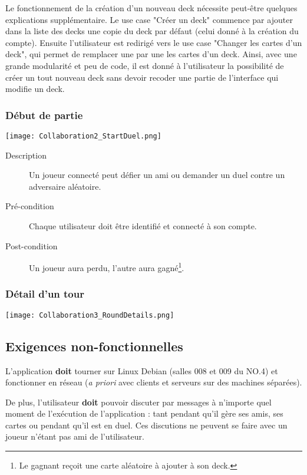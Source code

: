 \documentclass{article}
\begin{document}
			Le fonctionnement de la création d'un nouveau deck nécessite peut-être quelques explications
			supplémentaire. Le use case "Créer un deck" commence par ajouter dans la liste des decks
			une copie du deck par défaut (celui donné à la création du compte). Ensuite l'utilisateur
			est redirigé vers le use case "Changer les cartes d'un deck", qui permet de remplacer
			une par une les cartes d'un deck. Ainsi, avec une grande modularité et peu de code,
			il est donné à l'utilisateur la possibilité de créer un tout nouveau deck sans devoir recoder une partie
			de l'interface qui modifie un deck.

		\subsubsection{Début de partie}
			\begin{center}\texttt{[image: Collaboration2\_StartDuel.png]}\end{center}

			\begin{description}
				\item[Description] Un joueur connecté peut défier un ami ou demander un duel contre un adversaire aléatoire.
				\item[Pré-condition] Chaque utilisateur doit être identifié et connecté à son compte.
				\item[Post-condition] Un joueur aura perdu, l'autre aura gagné\footnote{Le gagnant reçoit une carte aléatoire à ajouter à son \gls{deck}.}.
			\end{description}

		\subsubsection{Détail d'un tour}
			\begin{center}\texttt{[image: Collaboration3\_RoundDetails.png]}\end{center}

	\subsection{Exigences non-fonctionnelles}
		L'application \textbf{doit} tourner sur Linux Debian (salles 008 et 009 du NO.4) et fonctionner en réseau (\textit{a priori} avec clients
		et serveurs sur des machines séparées).

		De plus, l'utilisateur \textbf{doit} pouvoir discuter par messages à n'importe quel moment de l'exécution de l'application : tant pendant
		qu'il gère ses amis, ses cartes ou pendant qu'il est en \gls{duel}. Ces discutions ne peuvent se faire avec un joueur
		n'étant pas ami de l'utilisateur.
\end{document}
